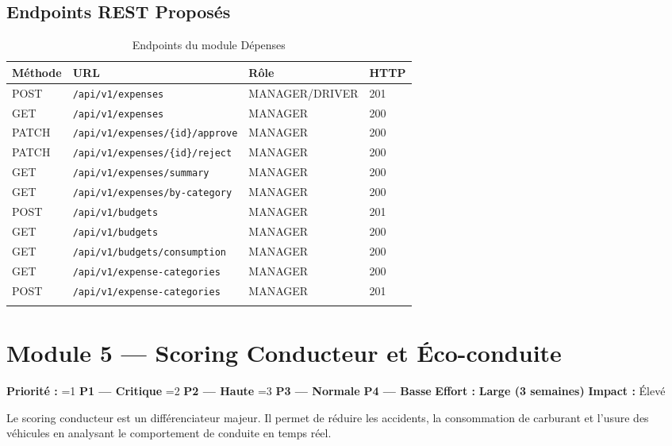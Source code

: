 \documentclass[12pt,a4paper]{report}
\newcommand{\prio}[1]{%
  \ifnum#1=1 \textcolor{fleeterror}{\textbf{P1 — Critique}}%
  \else\ifnum#1=2 \textcolor{fleetwarning}{\textbf{P2 — Haute}}%
  \else\ifnum#1=3 \textcolor{fleetsuccess}{\textbf{P3 — Normale}}%
  \else \textcolor{fleetgray}{\textbf{P4 — Basse}}%
  \fi\fi\fi}
\newcommand{\effort}[1]{\textcolor{fleetpurple}{\textbf{#1}}}
\begin{document}
\section{Endpoints REST Proposés}

\begin{longtable}{p{1.5cm}p{7cm}p{2.5cm}p{1.5cm}}
\toprule
\textbf{Méthode} & \textbf{URL} & \textbf{Rôle} & \textbf{HTTP} \\
\midrule
\endhead
POST & \texttt{/api/v1/expenses} & MANAGER/DRIVER & 201 \\
GET & \texttt{/api/v1/expenses} & MANAGER & 200 \\
PATCH & \texttt{/api/v1/expenses/\{id\}/approve} & MANAGER & 200 \\
PATCH & \texttt{/api/v1/expenses/\{id\}/reject} & MANAGER & 200 \\
GET & \texttt{/api/v1/expenses/summary} & MANAGER & 200 \\
GET & \texttt{/api/v1/expenses/by-category} & MANAGER & 200 \\
POST & \texttt{/api/v1/budgets} & MANAGER & 201 \\
GET & \texttt{/api/v1/budgets} & MANAGER & 200 \\
GET & \texttt{/api/v1/budgets/consumption} & MANAGER & 200 \\
GET & \texttt{/api/v1/expense-categories} & MANAGER & 200 \\
POST & \texttt{/api/v1/expense-categories} & MANAGER & 201 \\
\bottomrule
\caption{Endpoints du module Dépenses}
\end{longtable}

\chapter{Module 5 — Scoring Conducteur et Éco-conduite}

\begin{tcolorbox}[colback=fleetpurple!5, colframe=fleetpurple, title={\bfseries Résumé du Module}, fonttitle=\color{white}]
\textbf{Priorité :} \prio{2} \quad \textbf{Effort :} \effort{Large (3 semaines)} \quad \textbf{Impact :} Élevé

Le scoring conducteur est un différenciateur majeur. Il permet de réduire les accidents, la consommation de carburant et l'usure des véhicules en analysant le comportement de conduite en temps réel.
\end{tcolorbox}
\end{document}
